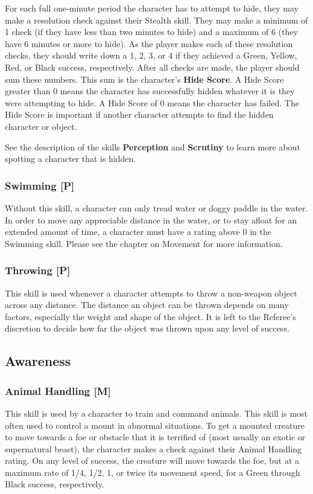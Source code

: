\documentclass[oneside]{book}
\begin{document}
\begin{multicols}{2}
 For each full one-minute period the character has to attempt to hide, they may make a resolution check against their Stealth skill. They may make a minimum of 1 check (if they have less than two minutes to hide) and a maximum of 6 (they have 6 minutes or more to hide). As the player makes each of these resolution checks, they should write down a 1, 2, 3, or 4 if they achieved a Green, Yellow, Red, or Black success, respectively. After all checks are made, the player should sum these numbers. This sum is the character's \textbf{Hide Score}. A Hide Score greater than 0 means the character has successfully hidden whatever it is they were attempting to hide. A Hide Score of 0 means the character has failed. The Hide Score is important if another character attempts to find the hidden character or object.

See the description of the skills \textbf{Perception} and \textbf{Scrutiny} to learn more about spotting a character that is hidden. 

\subsubsection{Swimming [P]}
Without this skill, a character can only tread water or doggy paddle in the water. In order to move any appreciable distance in the water, or to stay afloat for an extended amount of time, a character must have a rating above 0 in the Swimming skill. Please see the chapter on Movement for more information.

\subsubsection{Throwing [P]}
This skill is used whenever a character attempts to throw a non-weapon object across any distance. The distance an object can be thrown depends on many factors, especially the weight and shape of the object. It is left to the Referee's discretion to decide how far the object was thrown upon any level of success.

\subsection{Awareness}
\subsubsection{Animal Handling [M]}
This skill is used by a character to train and command animals. This skill is most often used to control a mount in abnormal situations. To get a mounted creature to move towards a foe or obstacle that it is terrified of (most usually an exotic or supernatural beast), the character makes a check against their Animal Handling rating. On any level of success, the creature will move towards the foe, but at a maximum rate of 1/4, 1/2, 1, or twice its movement speed, for a Green through Black success, respectively.


\end{multicols}
\end{document}
